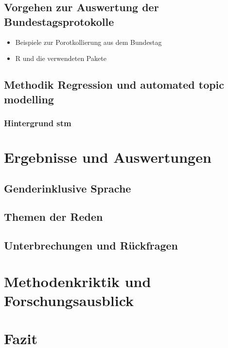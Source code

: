 \documentclass[12pt, 
    twoside=false, 
    bibliography=totoc, 
    numbers=endperiod, 
    headings=normal, 
    toc=chapterentrydotfill
    ]{scrbook}
\begin{document}
\section{Vorgehen zur Auswertung der Bundestagsprotokolle}
\begin{itemize}
    \item Beispiele zur Porotkollierung aus dem Bundestag
    \item R und die verwendeten Pakete
\end{itemize}

\section{Methodik Regression und automated topic modelling}

\subsection{Hintergrund stm}

\chapter{Ergebnisse und Auswertungen}

\section{Genderinklusive Sprache}

\section{Themen der Reden}

\section{Unterbrechungen und Rückfragen}

\chapter{Methodenkriktik und Forschungsausblick}

\chapter{Fazit}

\printbibliography[title={Literaturverzeichnis}]
\end{document}
